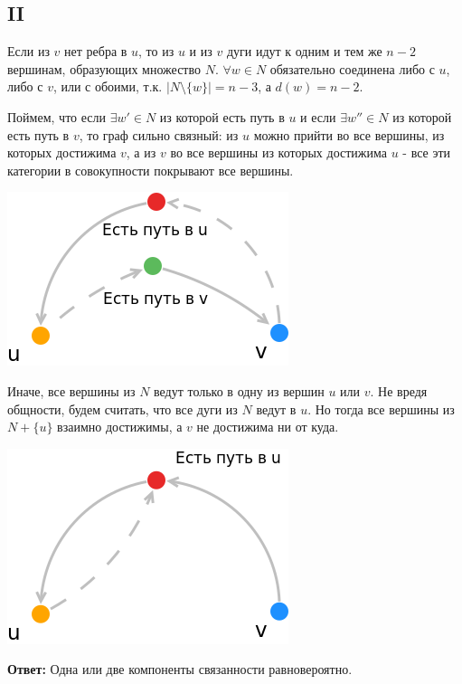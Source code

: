 \documentclass{article}
\begin{document}
	\subsection{II}
	
	Если из $v$ нет ребра в $u$, то из $u$ и из $v$ дуги идут к одним и тем же $n - 2$ вершинам, образующих множество $N$. $\forall w \in N$ обязательно соединена либо с $u$, либо с $v$, или с обоими, т.к. $|N \setminus \{w\}| = n - 3$, а $d(w) = n - 2$.
	
	Поймем, что если $\exists w' \in N $ из которой есть путь в $u$ и если $\exists w'' \in N $ из которой есть путь в $v$, то граф сильно связный: из $u$ можно прийти во все вершины, из которых достижима $v$, а из $v$ во все вершины из которых достижима $u$ - все эти категории в совокупности покрывают все вершины. 
	
		\begin{center}
			\includegraphics[scale=0.5]{8_3}
		\end{center}	
	
	Иначе, все вершины из $N$ ведут только в одну из вершин $u$ или $v$. Не вредя общности, будем считать, что все дуги из $N$ ведут в $u$. Но тогда все вершины из $N + \{u\}$ взаимно достижимы, а $v$ не достижима ни от куда.
		\begin{center}
			\includegraphics[scale=0.5]{8_4}
		\end{center}
	
	\textbf{Ответ:} Одна или две компоненты связанности равновероятно. 
	 
	
\end{document}
